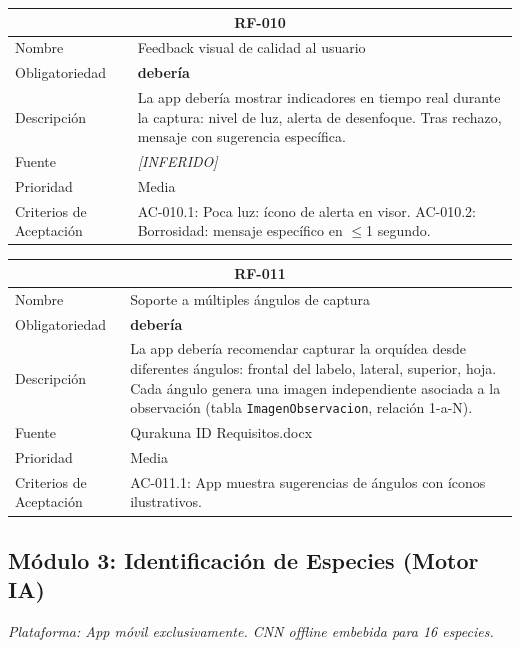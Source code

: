 \documentclass[12pt, a4paper]{article}
\newcommand{\inferido}{\textcolor{medio}{\textit{[INFERIDO]}}}
\begin{document}
\begin{longtable}{|p{3cm}|p{11.5cm}|}
\hline
\multicolumn{2}{|c|}{\textbf{RF-010}} \\
\hline
Nombre & Feedback visual de calidad al usuario \\
\hline
Obligatoriedad & \textbf{deber\'ia} \\
\hline
Descripci\'on & La app deber\'ia mostrar indicadores en tiempo real durante la captura: nivel de luz, alerta de desenfoque. Tras rechazo, mensaje con sugerencia espec\'ifica. \\
\hline
Fuente & \inferido{} \\
\hline
Prioridad & Media \\
\hline
Criterios de Aceptaci\'on &
AC-010.1: Poca luz: \'icono de alerta en visor. \newline
AC-010.2: Borrosidad: mensaje espec\'ifico en $\leq$1 segundo. \\
\hline
\end{longtable}

\begin{longtable}{|p{3cm}|p{11.5cm}|}
\hline
\multicolumn{2}{|c|}{\textbf{RF-011}} \\
\hline
Nombre & Soporte a m\'ultiples \'angulos de captura \\
\hline
Obligatoriedad & \textbf{deber\'ia} \\
\hline
Descripci\'on & La app deber\'ia recomendar capturar la orqu\'idea desde diferentes \'angulos: frontal del labelo, lateral, superior, hoja. Cada \'angulo genera una imagen independiente asociada a la observaci\'on (tabla \texttt{ImagenObservacion}, relaci\'on 1-a-N). \\
\hline
Fuente & Qurakuna ID Requisitos.docx \\
\hline
Prioridad & Media \\
\hline
Criterios de Aceptaci\'on &
AC-011.1: App muestra sugerencias de \'angulos con \'iconos ilustrativos. \\
\hline
\end{longtable}

\subsection{M\'odulo 3: Identificaci\'on de Especies (Motor IA)}

\textit{Plataforma: App m\'ovil exclusivamente. CNN offline embebida para 16 especies.}
\end{document}
